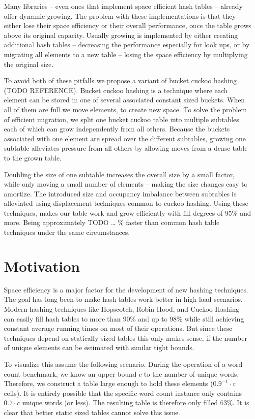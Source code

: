 \documentclass[a4paper,UKenglish]{lipics-v2016}
\begin{document}
Many libraries -- even ones that implement space efficient hash tables
-- already offer dynamic growing.  The problem with these
implementations is that they either lose their space efficiency or
their overall performance, once the table grows above its original
capacity.  Usually growing is implemented by either creating
additional hash tables -- decreasing the performance especially for
look ups, or by migrating all elements to a new table -- losing the
space efficiency by multiplying the original size.

To avoid both of these pitfalls we propose a variant of bucket cuckoo
hashing (TODO REFERENCE).  Bucket cuckoo hashing is a technique where
each element can be stored in one of several associated constant sized
buckets.  When all of them are full we move elements, to create new
space.  To solve the problem of efficient migration, we split one
bucket cuckoo table into multiple subtables each of which can grow
independently from all others.  Because the buckets associated with
one element are spread over the different subtables, growing one
subtable alleviates pressure from all others by allowing moves from a
dense table to the grown table.

Doubling the size of one subtable increases the overall size by a
small factor, while only moving a small number of elements -- making
the size changes easy to amortize. The introduced size and occupancy
imbalance between subtables is alleviated using displacement
techniques common to cuckoo hashing. Using these techniques, makes our
table work and grow efficiently with fill degrees of 95\% and more.
Being approximately TODO \ldots{} \% faster than common hash table
techniques under the same circumstances.

\section{Motivation}
\label{sec:motivation}
Space efficiency is a major factor for the development of new hashing
techniques.  The goal has long been to make hash tables work better in
high load scenarios.  Modern hashing techniques like Hopscotch, Robin
Hood, and Cuckoo Hashing can easily fill hash tables to more than 90\%
and up to 98\% while still achieving constant average running times on
most of their operations.  But since these techniques depend on
statically sized tables this only makes sense, if the number of unique
elements can be estimated with similar tight bounds.

To visualize this assume the following scenario.  During the operation
of a word count benchmark, we know an upper bound $c$ to the number of
unique words. Therefore, we construct a table large enough to hold
these elements ($0.9^{-1}\cdot c$ cells).  It is entirely possible
that the specific word count instance only contains $0.7\cdot c$
unique words (or less).  The resulting table is therefore only filled
63\%.  It is clear that better static sized tables cannot solve this
issue.
\end{document}
